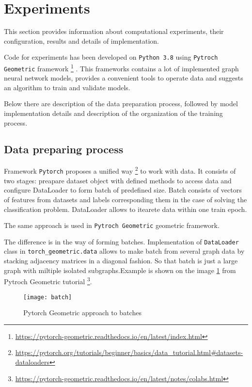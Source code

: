 \section{Experiments}
\label{sec:experiments}


This section provides information about computational experiments, their configuration, results and details
of implementation.

Code for experiments has been developed on \texttt{Python 3.8} using \texttt{Pytroch Geometric} framework
\footnote{\url{https://pytorch-geometric.readthedocs.io/en/latest/index.html}}
\cite{PyG}.
This frameworks contains a lot of implemented graph neural network models,
provides a convenient tools to operate data and suggests an algorithm to train and validate models.

Below there are description of the data preparation process, followed by model implementation details and description
of the organization of the training process.


\subsection{Data preparing process}

Framework \texttt{Pytorch} proposes a unified way \footnote{\url{https://pytorch.org/tutorials/beginner/basics/data_tutorial.html\#datasets-dataloaders}} to work with data.
It consists of two stages:
preapare dataset object with defined methods to access data and configure DataLoader
to form batch of predefined size. Batch consists of vectors of features from datasets and labels corresponding them
in the case of solving the classification problem. DataLoader allows to
itearete data within one train epoch.

The same approach is used in \texttt{Pytroch Geometric} geometric framework.

The difference is in the way of forming batches. Implementation of  \texttt{DataLoader} class in \texttt{torch\_geometric.data}
allows to make batch from several graph data by stacking adjacency matrices  in a diagonal fashion. So that
batch is just a large graph with miltiple isolated subgraphs.Example is shown on the image \ref{fig:batch} from Pytroch Geometric tutorial \footnote{ \url{https://pytorch-geometric.readthedocs.io/en/latest/notes/colabs.html} }.

\begin{figure}[h]
    \centering
    \texttt{[image: batch]}
    \caption{Pytorch Geometric approach to batches}
    \label{fig:batch}
\end{figure}

